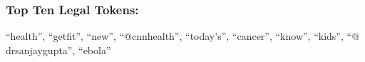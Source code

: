 \documentclass[fleqn]{article}
\begin{document}
\subsubsection*{Top Ten Legal Tokens:}
``health'', ``getfit'', ``new'', ``$@$cnnhealth'', ``today's'', ``cancer'', ``know'', ``kids'', ``$@$drsanjaygupta'', ``ebola''
\end{document}
